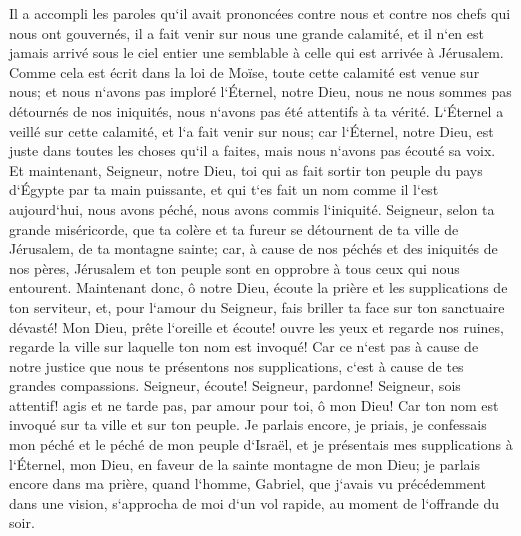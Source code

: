 \verse Il a accompli les paroles qu`il avait prononcées contre nous et contre nos chefs qui nous ont gouvernés, il a fait venir sur nous une grande calamité, et il n`en est jamais arrivé sous le ciel entier une semblable à celle qui est arrivée à Jérusalem. 
\verse Comme cela est écrit dans la loi de Moïse, toute cette calamité est venue sur nous; et nous n`avons pas imploré l`Éternel, notre Dieu, nous ne nous sommes pas détournés de nos iniquités, nous n`avons pas été attentifs à ta vérité. 
\verse L`Éternel a veillé sur cette calamité, et l`a fait venir sur nous; car l`Éternel, notre Dieu, est juste dans toutes les choses qu`il a faites, mais nous n`avons pas écouté sa voix. 
\verse Et maintenant, Seigneur, notre Dieu, toi qui as fait sortir ton peuple du pays d`Égypte par ta main puissante, et qui t`es fait un nom comme il l`est aujourd`hui, nous avons péché, nous avons commis l`iniquité. 
\verse Seigneur, selon ta grande miséricorde, que ta colère et ta fureur se détournent de ta ville de Jérusalem, de ta montagne sainte; car, à cause de nos péchés et des iniquités de nos pères, Jérusalem et ton peuple sont en opprobre à tous ceux qui nous entourent. 
\verse Maintenant donc, ô notre Dieu, écoute la prière et les supplications de ton serviteur, et, pour l`amour du Seigneur, fais briller ta face sur ton sanctuaire dévasté! 
\verse Mon Dieu, prête l`oreille et écoute! ouvre les yeux et regarde nos ruines, regarde la ville sur laquelle ton nom est invoqué! Car ce n`est pas à cause de notre justice que nous te présentons nos supplications, c`est à cause de tes grandes compassions. 
\verse Seigneur, écoute! Seigneur, pardonne! Seigneur, sois attentif! agis et ne tarde pas, par amour pour toi, ô mon Dieu! Car ton nom est invoqué sur ta ville et sur ton peuple. 
\verse Je parlais encore, je priais, je confessais mon péché et le péché de mon peuple d`Israël, et je présentais mes supplications à l`Éternel, mon Dieu, en faveur de la sainte montagne de mon Dieu; 
\verse je parlais encore dans ma prière, quand l`homme, Gabriel, que j`avais vu précédemment dans une vision, s`approcha de moi d`un vol rapide, au moment de l`offrande du soir. 
